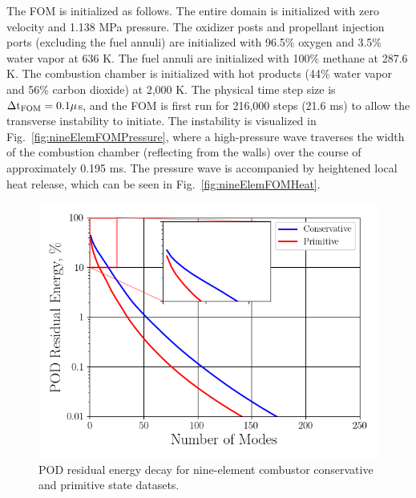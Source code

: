 The FOM is initialized as follows. The entire domain is initialized with zero velocity and 1.138 MPa pressure. The oxidizer posts and propellant injection ports (excluding the fuel annuli) are initialized with 96.5\% oxygen and 3.5\% water vapor at 636 K. The fuel annuli are initialized with 100\% methane at 287.6 K. The combustion chamber is initialized with hot products (44\% water vapor and 56\% carbon dioxide) at 2,000 K. The physical time step size is $\Delta \text{t}_{\text{FOM}} = 0.1 \mu$s, and the FOM is first run for 216,000 steps (21.6 ms) to allow the transverse instability to initiate. The instability is visualized in Fig.~\ref{fig:nineElemFOMPressure}, where a high-pressure wave traverses the width of the combustion chamber (reflecting from the walls) over the course of approximately 0.195 ms. The pressure wave is accompanied by heightened local heat release, which can be seen in Fig.~\ref{fig:nineElemFOMHeat}.

\begin{figure}
	\centering
	\includegraphics[width=0.8\linewidth]{Chapters/HPROMResults/Images/nineElem/nineElem_pod_energy.png}
	\caption{\label{fig:nineElemPODEnergy}POD residual energy decay for nine-element combustor conservative and primitive state datasets.}
\end{figure}

